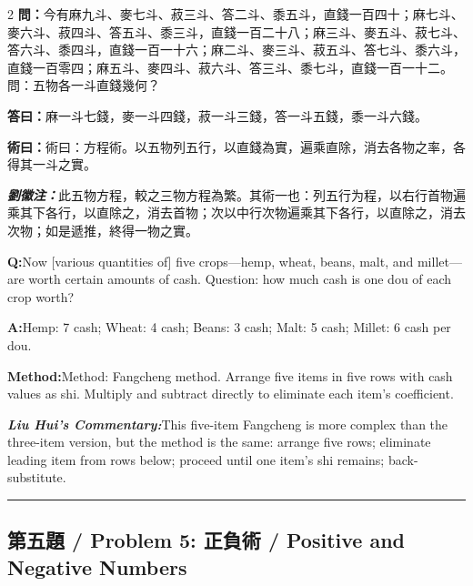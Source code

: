 \documentclass[11pt,a4paper]{article}
\newcommand{\cnwen}{\textcolor{cnlabelfg}{\textbf{問：}}}
\newcommand{\cnda}{\textbf{答曰：}}
\newcommand{\cnshu}{\textcolor{cnlabelfg}{\textbf{術曰：}}}
\newcommand{\cnzhu}{\textcolor{commentarycolor}{\textit{\textbf{劉徽注：}}}}
\newcommand{\enwen}{\textcolor{enlabelfg}{\textbf{Q:}}}
\newcommand{\enda}{\textcolor{enlabelfg}{\textbf{A:}}}
\newcommand{\enshu}{\textcolor{enlabelfg}{\textbf{Method:}}}
\newcommand{\enzhu}{\textcolor{enlabelfg}{\textit{\textbf{Liu Hui's Commentary:}}}}
\begin{document}
\begin{paracol}{2}
\switchcolumn[0]
\cnwen 今有麻九斗、麥七斗、菽三斗、答二斗、黍五斗，直錢一百四十；麻七斗、麥六斗、菽四斗、答五斗、黍三斗，直錢一百二十八；麻三斗、麥五斗、菽七斗、答六斗、黍四斗，直錢一百一十六；麻二斗、麥三斗、菽五斗、答七斗、黍六斗，直錢一百零四；麻五斗、麥四斗、菽六斗、答三斗、黍七斗，直錢一百一十二。問：五物各一斗直錢幾何？

\cnda 麻一斗七錢，麥一斗四錢，菽一斗三錢，答一斗五錢，黍一斗六錢。

\cnshu 術曰：方程術。以五物列五行，以直錢為實，遍乘直除，消去各物之率，各得其一斗之實。

\cnzhu 此五物方程，較之三物方程為繁。其術一也：列五行为程，以右行首物遍乘其下各行，以直除之，消去首物；次以中行次物遍乘其下各行，以直除之，消去次物；如是遞推，終得一物之實。

\switchcolumn[1]
\enwen Now [various quantities of] five crops---hemp, wheat, beans, malt, and millet---are worth certain amounts of cash. Question: how much cash is one dou of each crop worth?

\enda Hemp: 7 cash; Wheat: 4 cash; Beans: 3 cash; Malt: 5 cash; Millet: 6 cash per dou.

\enshu Method: Fangcheng method. Arrange five items in five rows with cash values as shi. Multiply and subtract directly to eliminate each item's coefficient.

\enzhu This five-item Fangcheng is more complex than the three-item version, but the method is the same: arrange five rows; eliminate leading item from rows below; proceed until one item's shi remains; back-substitute.
\end{paracol}

\bigskip\hrule\bigskip

\subsection{第五題 / Problem 5: 正負術 / Positive and Negative Numbers}
\end{document}
